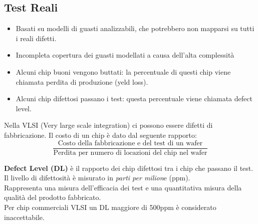 \documentclass[a4paper]{article}
\theoremstyle{definition}
\begin{document}
		\subsection{Test Reali}
			\begin{itemize}
				\item Basati su modelli di guasti analizzabili, che potrebbero non mapparsi su tutti i reali difetti. 
				\item Incompleta copertura dei guasti modellati a causa dell'alta complessità
				\item Alcuni chip buoni vengono buttati: la percentuale di questi chip viene chiamata perdita di produzione (yeld loss).
				\item Alcuni chip difettosi passano i test: questa percentuale viene chiamata defect level.
			\end{itemize}
		
			Nella VLSI (Very large scale integration) ci possono essere difetti di fabbricazione. Il costo di un chip è dato dal seguente rapporto:
			\[
				\dfrac{\text{Costo della fabbricazione e del test di un wafer}}{\text{Perdita per numero di locazioni del chip nel wafer}}
			\]
			
			\textbf{Defect Level (DL)} è il rapporto dei chip difettosi tra i chip che passano il test. \\
			Il livello di difettosità è misurato in \textit{parti per milion}e (ppm). \\
			Rappresenta una misura dell'efficacia dei test e una quantitativa misura della qualità del prodotto fabbricato. \\
			Per chip commerciali VLSI un DL maggiore di 500ppm è considerato inaccettabile.
		
\end{document}
